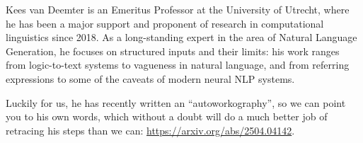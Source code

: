 Kees van Deemter is an Emeritus Professor at the University of Utrecht, where he has been a major support and proponent of research in computational linguistics since 2018.
As a long-standing expert in the area of Natural Language Generation, he focuses on structured inputs and their limits: his work ranges from logic-to-text systems to vagueness in natural language, and from referring expressions to some of the caveats of modern neural NLP systems.

Luckily for us, he has recently written an ``autoworkography'', so we can point you to his own words, which without a doubt will do a much better job of retracing his steps than we can: \url{https://arxiv.org/abs/2504.04142}.
